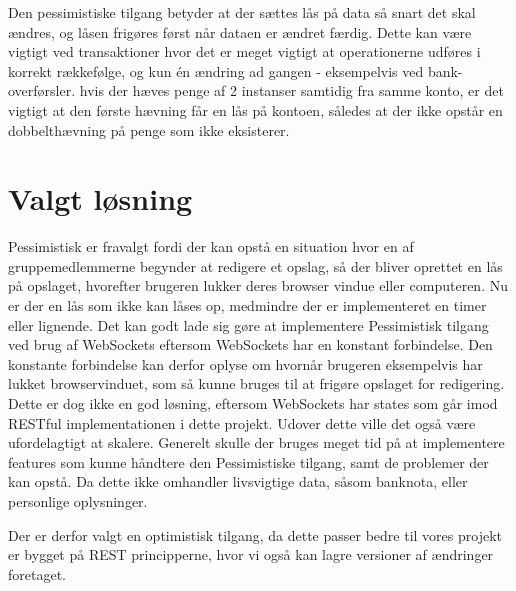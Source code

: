 Den pessimistiske tilgang betyder at der sættes lås på data så snart det skal ændres, og låsen frigøres først når dataen er ændret færdig. Dette kan være vigtigt ved transaktioner hvor det er meget vigtigt at operationerne udføres i korrekt rækkefølge, og kun én ændring ad gangen - eksempelvis ved bank-overførsler. hvis der hæves penge af 2 instanser samtidig fra samme konto, er det vigtigt at den første hævning får en lås på kontoen, således at der ikke opstår en dobbelthævning på penge som ikke eksisterer. 





\section{Valgt løsning}\label{sec:chosen_solution}
Pessimistisk er fravalgt fordi der kan opstå en situation hvor en af gruppemedlemmerne begynder at redigere et opslag, så der bliver oprettet en lås på opslaget, hvorefter brugeren lukker deres browser vindue eller computeren. Nu er der en lås som ikke kan låses op, medmindre der er implementeret en timer eller lignende. Det kan godt lade sig gøre at implementere Pessimistisk tilgang ved brug af WebSockets\cite{websockets} eftersom WebSockets har en konstant forbindelse. Den konstante forbindelse kan derfor oplyse om hvornår brugeren eksempelvis har lukket browservinduet, som så kunne bruges til at frigøre opslaget for redigering. Dette er dog ikke en god løsning, eftersom WebSockets har states som går imod RESTful implementationen i dette projekt. Udover dette ville det også være ufordelagtigt at skalere. 
Generelt skulle der bruges meget tid på at implementere features som kunne håndtere den Pessimistiske tilgang, samt de problemer der kan opstå. Da dette ikke omhandler livsvigtige data, såsom banknota, eller personlige oplysninger. 

Der er derfor valgt en optimistisk tilgang, da dette passer bedre til vores projekt er bygget på REST principperne, hvor vi også kan lagre versioner af ændringer foretaget. 
